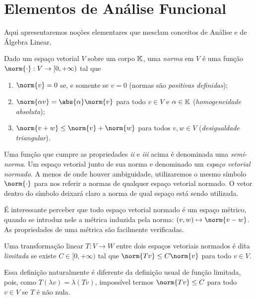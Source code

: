 
\section{Elementos de Análise Funcional}

Aqui apresentaremos noções elementares que mesclam conceitos de Análise e de Álgebra Linear.

\begin{defn}
    Dado um espaço vetorial \( V \) sobre um corpo \( \mathbb{K} \), uma \emph{norma} em \( V \) é uma função \( \norm{ \cdot } : V \to [0, +\infty) \) tal que
    \begin{enumerate}[label=\roman*)]
        \item \( \norm{ v } = 0 \) se, e somente se \( v = 0 \) (normas são \emph{positivas definidas});
        \item \( \norm{ \alpha v } = \abs{ \alpha } \norm{ v } \) para todo \( v \in V \) e \( \alpha \in \mathbb{K} \) (\emph{homogeneidade absoluta});
        \item \( \norm{ v + w } \leq \norm{ v } + \norm{ w } \) para todos \( v, w \in V \) (\emph{desigualdade triangular}).
    \end{enumerate}
\end{defn}
Uma função que cumpre as propriedades \emph{ii} e \emph{iii} acima é denominada uma \emph{semi-norma}.
Um espaço vetorial junto de sua norma e denominado um \emph{espaço vetorial normado}.
A menos de onde houver ambiguidade, utilizaremos o mesmo símbolo \( \norm{ \cdot } \) para nos referir a normas de qualquer espaço vetorial normado.
O vetor dentro do símbolo deixará claro a norma de qual espaço está sendo utilizada.

É interessante perceber que todo espaço vetorial normado é um espaço métrico, quando se introduz nele a métrica induzida pela norma: \( (v, w) \mapsto \norm{ v - w } \).
As propriedades de uma métrica são facilmente verificadas.

\begin{defn}
    Uma transformação linear \( T : V \to W \) entre dois espaços vetoriais normados é dita \emph{limitada} se existe \( C \in [0, +\infty) \) tal que \( \norm{ Tv } \leq C \norm{ v } \) para todo \( v \in V \).
\end{defn}
Essa definição naturalmente é diferente da definição usual de função limitada, pois, como \( T(\lambda v) = \lambda (Tv) \), impossível termos \( \norm{ Tv } \leq C \) para todo \( v \in V \) se \( T \) é não nula.

